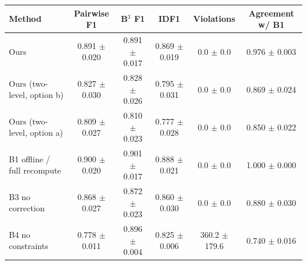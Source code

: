 \begin{tabular}{lccccc}
\toprule
Method & Pairwise F1 & B$^3$ F1 & IDF1 & Violations & Agreement w/ B1 \\
\midrule
Ours & 0.891 $\pm$ 0.020 & 0.891 $\pm$ 0.017 & 0.869 $\pm$ 0.019 & 0.0 $\pm$ 0.0 & 0.976 $\pm$ 0.003 \\
Ours (two-level, option b) & 0.827 $\pm$ 0.030 & 0.828 $\pm$ 0.026 & 0.795 $\pm$ 0.031 & 0.0 $\pm$ 0.0 & 0.869 $\pm$ 0.024 \\
Ours (two-level, option a) & 0.809 $\pm$ 0.027 & 0.810 $\pm$ 0.023 & 0.777 $\pm$ 0.028 & 0.0 $\pm$ 0.0 & 0.850 $\pm$ 0.022 \\
B1 offline / full recompute & 0.900 $\pm$ 0.020 & 0.901 $\pm$ 0.017 & 0.888 $\pm$ 0.021 & 0.0 $\pm$ 0.0 & 1.000 $\pm$ 0.000 \\
B3 no correction & 0.868 $\pm$ 0.027 & 0.872 $\pm$ 0.023 & 0.860 $\pm$ 0.030 & 0.0 $\pm$ 0.0 & 0.880 $\pm$ 0.030 \\
B4 no constraints & 0.778 $\pm$ 0.011 & 0.896 $\pm$ 0.004 & 0.825 $\pm$ 0.006 & 360.2 $\pm$ 179.6 & 0.740 $\pm$ 0.016 \\
\bottomrule
\end{tabular}
